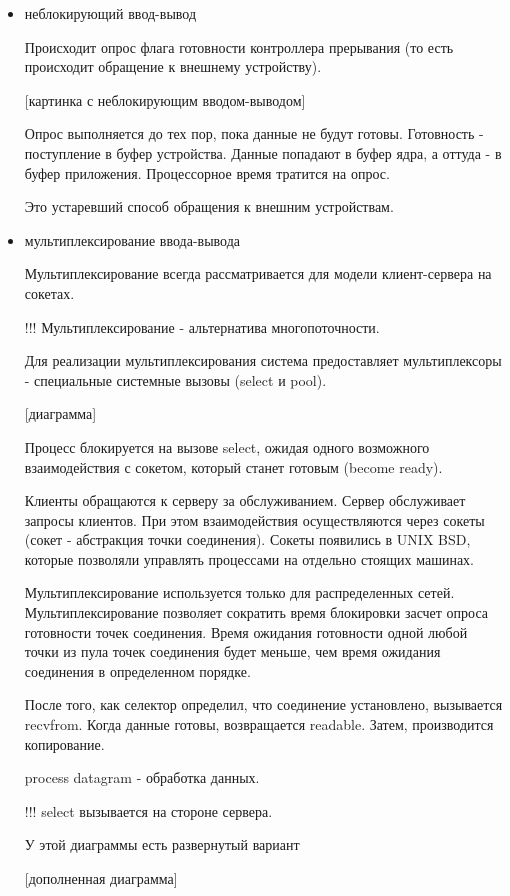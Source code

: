 \documentclass[14pt, a4paper]{article}
\begin{document}
\begin{itemize}
		\item неблокирующий ввод-вывод
		
		Происходит опрос флага готовности контроллера прерывания (то есть происходит обращение к внешнему устройству).
		
		[картинка с неблокирующим вводом-выводом]
		
		Опрос выполняется до тех пор, пока данные не будут готовы. Готовность - поступление в буфер устройства. Данные попадают в буфер ядра, а оттуда - в буфер приложения. Процессорное время тратится на опрос.
		
		Это устаревший способ обращения к внешним устройствам.
		
		\item мультиплексирование ввода-вывода
		
		Мультиплексирование всегда рассматривается для модели клиент-сервера на сокетах.
		
		!!! Мультиплексирование - альтернатива многопоточности.
		
		Для реализации мультиплексирования система предоставляет мультиплексоры - специальные системные вызовы (select и pool).
		
		[диаграмма]
		
		Процесс блокируется на вызове select, ожидая одного возможного взаимодействия с сокетом, который станет готовым (become ready).
		
		Клиенты обращаются к серверу за обслуживанием. Сервер обслуживает запросы клиентов. При этом взаимодействия осуществляются через сокеты (сокет - абстракция точки соединения). Сокеты появились в UNIX BSD, которые позволяли управлять процессами на отдельно стоящих машинах.
		
		Мультиплексирование используется только для распределенных сетей. Мультиплексирование позволяет сократить время блокировки засчет опроса готовности точек соединения. Время ожидания готовности одной любой точки из пула точек соединения будет меньше, чем время ожидания соединения в определенном порядке.
		
		После того, как селектор определил, что соединение установлено, вызывается recvfrom. Когда данные готовы, возвращается readable. Затем, производится копирование.
		
		process datagram - обработка данных.
		
		!!! select вызывается на стороне сервера.
		
		У этой диаграммы есть развернутый вариант
		
		[дополненная диаграмма]
	\end{itemize}
\end{document}
